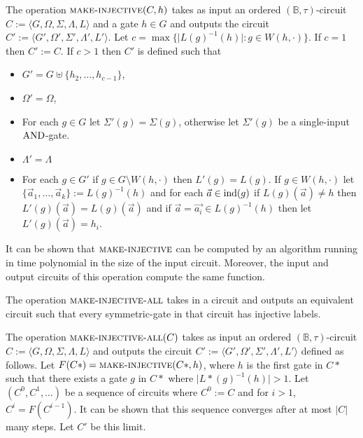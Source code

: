 \documentclass[../paper.tex]{subfiles}
\begin{document}
\begin{definition}
  The operation ${\normalfont\textsc{make-injective}}(C, h)$ takes as input an ordered
  $(\mathbb{B}, \tau)$-circuit $C := \langle G, \Omega, \Sigma , \Lambda, L
  \rangle$ and a gate $h \in G$ and outputs the circuit $C' := \langle G',
  \Omega', \Sigma', \Lambda', L' \rangle$. Let $c = \max \{\vert
  L(g)^{-1}(h)\vert : g \in W(h, \cdot)\}$. If $c = 1$ then $C' := C$. If $c >
  1$ then $C'$ is defined such that
  \begin{itemize}
    \setlength\itemsep{0mm}
  \item $G' = G \uplus \{h_2, \ldots, h_{c-1}\}$,
  \item $\Omega' = \Omega$,
  \item For each $g \in G$ let $\Sigma' (g) = \Sigma(g)$, otherwise let
    $\Sigma'(g)$ be a single-input $\text{\upshape AND}$-gate.
  \item $\Lambda'= \Lambda$
  \item For each $g \in G'$ if $g \in G \setminus W(h, \cdot)$ then $L'(g) =
    L(g)$. If $g \in W(h, \cdot)$ let $\{\vec{a}_1, \ldots, \vec{a}_k\} :=
    L(g)^{-1}(h)$ and for each $\vec{a} \in \text{\upshape ind}(g)$ if $L(g)(\vec{a}) \neq h$
    then $L'(g)(\vec{a}) = L(g)(\vec{a})$ and if $\vec{a} = \vec{a_i} \in
    L(g)^{-1}(h)$ then let $L'(g)(\vec{a}) = h_i$.
  \end{itemize}
\end{definition}

It can be shown that ${\normalfont\textsc{make-injective}}$ can be computed by an algorithm
running in time polynomial in the size of the input circuit. Moreover, the input
and output circuits of this operation compute the same function.


The operation ${\normalfont\textsc{make-injective-all}}$ takes in a circuit and outputs an
equivalent circuit such that every symmetric-gate in that circuit has injective
labels.

\begin{definition}
  The operation ${\normalfont\textsc{make-injective-all}}(C)$ takes as input an ordered
  $(\mathbb{B}, \tau)$-circuit $C := \langle G, \Omega, \Sigma , \Lambda, L
  \rangle$ and outputs the circuit $C' := \langle G', \Omega', \Sigma',
  \Lambda', L' \rangle$ defined as follows. Let $F(C*) = {\normalfont\textsc{make-injective}}(C*,
  h)$, where $h$ is the first gate in $C*$ such that there exists a gate $g$ in
  $C*$ where $\vert L*(g)^{-1}(h)\vert > 1$. Let $(C^0, C^1, \ldots)$ be a
  sequence of circuits where $C^0 := C$ and for $i > 1$, $C^i = F(C^{i-1})$. It
  can be shown that this sequence converges after at most $\vert C \vert$ many
  steps. Let $C'$ be this limit.
\end{definition}
\end{document}

